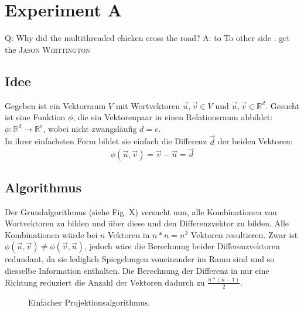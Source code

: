
\chapter{Experiment A} %

\label{Chapter6} %


\begin{itquote}
Q: Why did the multithreaded chicken cross the road?
A: to To other side . get the
\flushright
\textsc{Jason Whittington}
\end{itquote}

\section{Idee}

Gegeben ist ein Vektorraum $V$ mit Wortvektoren $\vec{u}, \vec{v} \in V$ und $\vec{u},\vec{v}\in\mathbb{R}^d$.
Gesucht ist eine Funktion $\phi$, die ein Vektorenpaar in einen Relationsraum abbildet: $\phi: \mathbb{R}^d \to \mathbb{R}^e$, wobei
nicht zwangsläufig $d = e$.\\
In ihrer einfachsten Form bildet sie einfach die Differenz $\vec{d}$ der beiden Vektoren:
\begin{equation}
  \phi(\vec{u}, \vec{v}) = \vec{v} - \vec{u} = \vec{d}
\end{equation}

\section{Algorithmus}

Der Grundalgorithmus (siehe Fig. X) versucht nun, alle Kombinationen von Wortvektoren zu bilden und über diese
und den Differenzvektor zu bilden. Alle Kombinationen würde bei $n$ Vektoren in $n * n = n^2$ Vektoren resultieren.
Zwar ist $\phi(\vec{u}, \vec{v}) \neq \phi(\vec{v}, \vec{u})$, jedoch wäre die Berechnung beider Differenzvektoren redundant,
da sie lediglich Spiegelungen voneinander im Raum sind und so diesselbe Information enthalten. Die Berechnung
der Differenz in nur eine Richtung reduziert die Anzahl der Vektoren dadurch zu $\frac{n * (n-1)}{2}$.

\begin{figure}[h]
  \centering
  \begin{algorithm}[H]
  \end{algorithm}
  \caption[Einfacher Projektionsalgorithmus]{Einfacher Projektionsalgorithmus.}
\end{figure}


